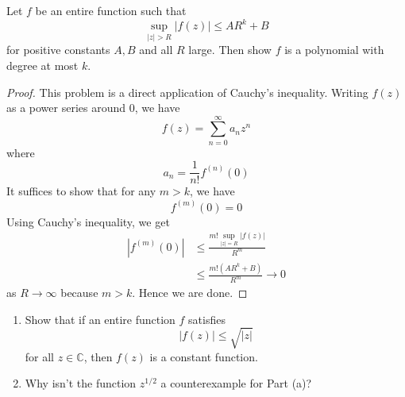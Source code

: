 \documentclass[openany]{book}
\begin{document}
\begin{prob}[Fall 2019, Q2]
    Let $f$ be an entire function such that 
    \begin{equation*}
        \sup_{|z|>R}|f(z)|\leq AR^k+B
    \end{equation*}
    for positive constants $A,B$ and all $R$ large. Then show $f$ is a polynomial with degree at most $k$.
\end{prob}

\begin{proof}
    This problem is a direct application of Cauchy's inequality. Writing $f(z)$ as a power series around $0$, we have 
    \begin{equation*}
        f(z)=\sum_{n=0}^\infty a_nz^n
    \end{equation*}
    where 
    \begin{equation*}
        a_n=\frac{1}{n!}f^{(n)}(0)
    \end{equation*}
    It suffices to show that for any $m>k$, we have 
    \begin{equation*}
        f^{(m)}(0)= 0
    \end{equation*}
    Using Cauchy's inequality, we get 
    \begin{align*}
        |f^{(m)}(0)|&\leq\frac{m!\sup_{|z|=R}|f(z)|}{R^m}\\
        &\leq \frac{m!(AR^k+B)}{R^m}\to 0
    \end{align*}
    as $R\to\infty$ because $m>k$. Hence we are done.
\end{proof}


\begin{prob}[Fall 2023, Q1]
    \begin{enumerate}
        \item[(a)] Show that if an entire function $f$ satisfies
        \[
            |f(z)| \leq \sqrt{|z|}
        \]
        for all $z \in \mathbb{C}$, then $f(z)$ is a constant function.
    
        \item[(b)] Why isn't the function $z^{1/2}$ a counterexample for Part (a)?
    \end{enumerate}
\end{prob}
\end{document}

